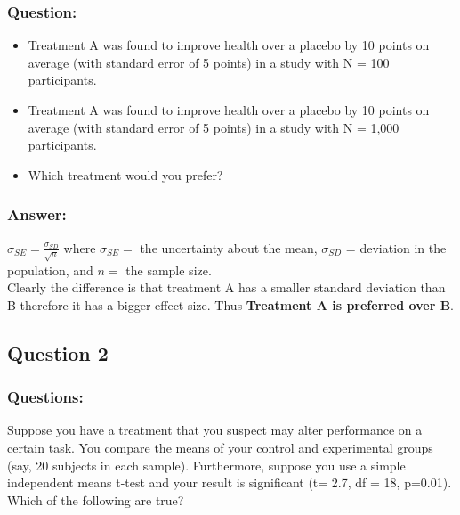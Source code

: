 \subsubsection{Question:}
\begin{itemize}
    \item Treatment A was found to improve health over a placebo by 10 points on average (with standard error of 5 points) in a study with N = 100 participants.
    \item Treatment A was found to improve health over a placebo by 10 points on average (with standard error of 5 points) in a study with N = 1,000 participants.
    \item Which treatment would you prefer?
\end{itemize}
\subsubsection{Answer:}
    $\sigma_{SE}= \frac{\sigma_{SD}}{\sqrt{n}}$ where $\sigma_{SE} = $ the uncertainty about the mean, $\sigma_{SD}$ = deviation in the population, and $n =$ the sample size.  \\
    
    \noindent Clearly the difference is that treatment A has a smaller standard deviation than B therefore it has a bigger effect size. Thus \textbf{Treatment A is preferred over B}.

\subsection{Question 2}
\subsubsection{Questions:}
Suppose you have a treatment that you suspect may alter performance on a certain task. You compare the means of your control and experimental groups (say, 20 subjects in each sample). Furthermore, suppose you use a simple independent means t-test and your result is significant (t= 2.7, df = 18, p=0.01). Which of the following are true?

